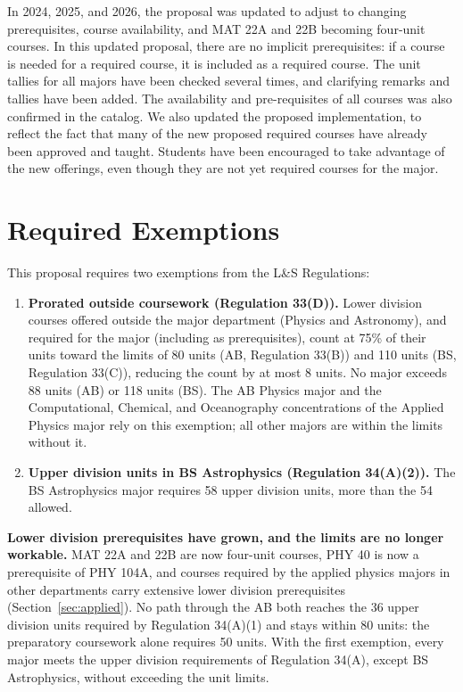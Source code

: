 \documentclass[12pt]{article}
\begin{document}
In 2024, 2025, and 2026, the proposal was updated to adjust to changing prerequisites, course
availability, and MAT 22A and 22B becoming four-unit courses.  In this updated proposal, there are no
implicit prerequisites: if a course is needed for a required course, it is included as a required
course.  The unit tallies for all majors have been checked several times, and clarifying remarks and
tallies have been added.  The availability and pre-requisites of all courses was also confirmed in
the catalog.  We also updated the proposed implementation, to reflect the fact that many of the new
proposed required courses have already been approved and taught.  Students have been encouraged to
take advantage of the new offerings, even though they are not yet required courses for the major.

\newpage

\section{Required Exemptions}
\label{sec:exemption}

This proposal requires two exemptions from the L\&S Regulations:
\begin{enumerate}
\item {\bf Prorated outside coursework (Regulation 33(D)).}  Lower
  division courses offered outside the major department (Physics and
  Astronomy), and required for the major (including as prerequisites),
  count at 75\% of their units toward the limits of 80 units (AB,
  Regulation 33(B)) and 110 units (BS, Regulation 33(C)), reducing the
  count by at most 8 units.  No major exceeds 88 units (AB) or 118
  units (BS).  The AB Physics major and the Computational, Chemical,
  and Oceanography concentrations of the Applied Physics major rely on
  this exemption;  all other majors are within the limits without it.
\item {\bf Upper division units in BS Astrophysics (Regulation
  34(A)(2)).}  The BS Astrophysics major requires 58 upper division
  units, more than the 54 allowed.
\end{enumerate}

\noindent
{\bf Lower division prerequisites have grown, and the limits are no
  longer workable.}  MAT 22A and 22B are now four-unit courses, PHY 40
is now a prerequisite of PHY 104A, and courses required by the applied
physics majors in other departments carry extensive lower division
prerequisites (Section~\ref{sec:applied}).  No path through the AB
both reaches the 36 upper division units required by Regulation
34(A)(1) and stays within 80 units:  the preparatory coursework alone
requires 50 units.  With the first exemption, every major meets the
upper division requirements of Regulation 34(A), except BS
Astrophysics, without exceeding the unit limits.
\end{document}
